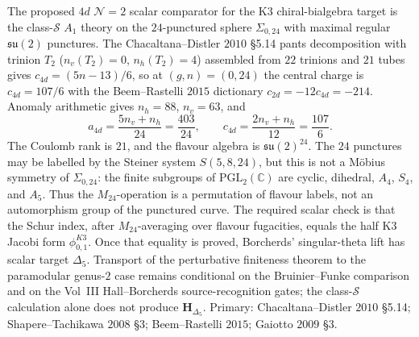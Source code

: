\begin{remark}
\label{rem:thqg-pf-classS-parent}
The proposed $4d$ $\mathcal{N} = 2$ scalar comparator for the K3
chiral-bialgebra target is the class-$\mathcal{S}$ $A_1$ theory on the
$24$-punctured sphere
$\Sigma_{0,24}$ with maximal regular $\mathfrak{su}(2)$ punctures.
The Chacaltana--Distler $2010$ \S5.14 pants decomposition with
trinion $T_2$ ($n_v(T_2) = 0$, $n_h(T_2) = 4$) assembled from $22$
trinions and $21$ tubes gives $c_{4d} = (5n - 13)/6$, so at
$(g, n) = (0, 24)$ the central charge is $c_{4d} = 107/6$ with the
Beem--Rastelli $2015$ dictionary $c_{2d} = -12c_{4d} = -214$. Anomaly
arithmetic gives $n_h=88$, $n_v=63$, and
\[
a_{4d}=\frac{5n_v+n_h}{24}=\frac{403}{24},
\qquad
c_{4d}=\frac{2n_v+n_h}{12}=\frac{107}{6}.
\]
The Coulomb rank is $21$, and the flavour algebra is
$\mathfrak{su}(2)^{24}$. The $24$ punctures may be labelled by the
Steiner system $S(5,8,24)$, but this is not a M\"obius symmetry of
\(\Sigma_{0,24}\): the finite subgroups of
\(\mathrm{PGL}_2(\mathbb C)\) are cyclic, dihedral, \(A_4\), \(S_4\),
and \(A_5\). Thus the \(M_{24}\)-operation is a permutation of flavour
labels, not an automorphism group of the punctured curve. The required
scalar check is that the Schur index, after \(M_{24}\)-averaging over
flavour fugacities, equals the half K3 Jacobi form \(\phi_{0,1}^{K3}\). Once
that equality is proved, Borcherds' singular-theta
lift has scalar target $\Delta_5$. Transport of the perturbative
finiteness theorem to the paramodular genus-$2$ case remains conditional
on the Bruinier--Funke comparison and on the Vol~III Hall--Borcherds
source-recognition gates; the class-$\mathcal{S}$ calculation alone does
not produce $\mathbf H_{\Delta_5}$. Primary:
Chacaltana--Distler $2010$ \S5.14; Shapere--Tachikawa $2008$ \S3;
Beem--Rastelli $2015$; Gaiotto $2009$ \S3.
\end{remark}

